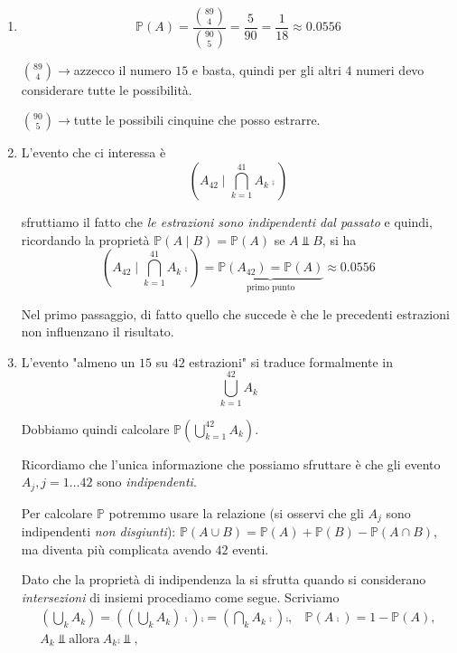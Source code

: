 \begin{enumerate}
\item \begin{equation*}
\mathbb{P}( A) =\frac{\binom{89}{4}}{\binom{90}{5}} =\frac{5}{90} =\frac{1}{18} \approx 0.0556
\end{equation*}

$\binom{89}{4}\rightarrow $azzecco il numero $15$ e basta, quindi per gli altri $4$ numeri devo considerare tutte le possibilità.

$\binom{90}{5}\rightarrow $tutte le possibili cinquine che posso estrarre.
\item L'evento che ci interessa è\begin{equation*}
\left( A_{42} \mid \bigcap _{k=1}^{41} A_{k}\comp\right)
\end{equation*}

sfruttiamo il fatto che \textit{le estrazioni sono indipendenti dal passato} e quindi, ricordando la proprietà $\mathbb{P}( A\mid B) =\mathbb{P}( A)$ se $A\Bot B$, si ha\begin{equation*}
\left( A_{42} \mid\bigcap _{k=1}^{41} A_{k}\comp\right) =\underbrace{\mathbb{P}( A_{42}) =\mathbb{P}( A)}_{\text{primo punto}} \approx 0.0556
\end{equation*}

Nel primo passaggio, di fatto quello che succede è che le precedenti estrazioni non influenzano il risultato.
\item L'evento "almeno un $15$ su $42$ estrazioni" si traduce formalmente in\begin{equation*}
\bigcup _{k=1}^{42} A_{k}
\end{equation*}

Dobbiamo quindi calcolare $\mathbb{P}\left(\bigcup _{k=1}^{42} A_{k}\right)$.

Ricordiamo che l'unica informazione che possiamo sfruttare è che gli evento $A_{j} ,j=1\dots 42$ sono \textit{indipendenti}.

Per calcolare $\mathbb{P}$ potremmo usare la relazione (si osservi che gli $A_{j}$ sono indipendenti \textit{non disgiunti}): $\mathbb{P}( A\cup B) =\mathbb{P}( A) +\mathbb{P}( B) -\mathbb{P}( A\cap B)$, ma diventa più complicata avendo $42$ eventi.

Dato che la proprietà di indipendenza la si sfrutta quando si considerano \textit{intersezioni} di insiemi procediamo come segue. Scriviamo\begin{gather*}
\left(\bigcup _{k} A_{k}\right) =\left(\left(\bigcup _{k} A_{k}\right)\comp\right)\comp =\left(\bigcap _{k} A_{k}\comp\right)\comp ,\ \ \ \ \mathbb{P}\left( A\comp\right) =1-\mathbb{P}( A) ,\\
A_{k} \Bot \text{allora} \ A_{k}\comp \Bot ,
\end{gather*}


\end{enumerate}
